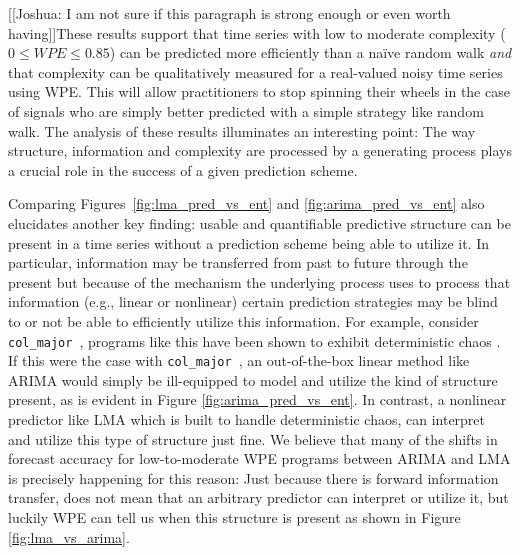 \documentclass{article}
\newcommand{\col}{{\tt col\_major}~}
\begin{document}
[[Joshua: I am not sure if this paragraph is strong enough or even worth having]]These results support that time series with low to moderate complexity ($0\le WPE \le 0.85$) can be predicted more efficiently than a na\"ive random walk \emph{and} that complexity can be qualitatively measured for a real-valued noisy time series using WPE. This will allow practitioners to stop spinning their wheels in the case of signals who are simply better predicted with a simple strategy like random walk. The analysis of these results illuminates an interesting point: The way structure, information and complexity are processed by a generating process plays a crucial role in the success of a given prediction scheme. 

















Comparing Figures~\ref{fig:lma_pred_vs_ent} and \ref{fig:arima_pred_vs_ent} also elucidates another key finding: usable and quantifiable predictive structure can be present in a time series without a prediction scheme being able to utilize it. In particular, information may be transferred from past to future through the present but because of the mechanism the underlying process uses to process that information  (e.g., linear or nonlinear) certain prediction strategies may be blind to or not be able to efficiently utilize this information. For example, consider \col, programs like this have been shown to exhibit deterministic chaos \cite{mytkowicz09}. If this were the case with \col, an out-of-the-box linear method like ARIMA would simply be ill-equipped to model and utilize the kind of structure present, as is evident in Figure \ref{fig:arima_pred_vs_ent}. In contrast, a nonlinear predictor like LMA which is built to handle deterministic chaos, can interpret and utilize this type of structure just fine. We believe that many of the shifts in forecast accuracy for low-to-moderate WPE programs between ARIMA and LMA is precisely happening for this reason: Just because there is forward information transfer, does not mean that an arbitrary predictor can interpret or utilize it, but luckily WPE can tell us when this structure is present as shown in Figure \ref{fig:lma_vs_arima}.
\end{document}
